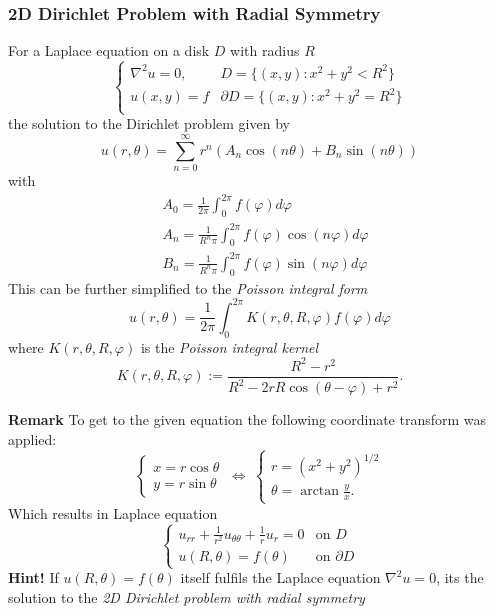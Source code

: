 \subsubsection{2D Dirichlet Problem with Radial Symmetry}\label{sssec:laplace_dir_radial}
For a Laplace equation on a disk $D$ with radius $R$
\begin{equation*}
    \begin{cases}
        \nabla^2 u=0, & D=\{(x,y): x^2+y^2 < R^2\}          \\
        u(x,y)=f      & \partial D=\{(x,y): x^2+y^2 = R^2\} \\
    \end{cases}
\end{equation*}
the solution to the Dirichlet problem given by
\begin{equation*}
    u(r,\theta)=\sum_{n=0}^\infty r^n(A_n\cos(n\theta)+B_n\sin(n\theta))
\end{equation*}
with
\begin{align*}
     & A_{0} =\frac{1}{2\pi}\int_0^{2\pi}f(\varphi)d\varphi                 \\
     & A_{n} =\frac{1}{R^n\pi}\int_0^{2\pi}f(\varphi)\cos(n\varphi)d\varphi \\
     & B_{n} =\frac{1}{R^n\pi}\int_0^{2\pi}f(\varphi)\sin(n\varphi)d\varphi
\end{align*}
This can be further simplified to the \textit{Poisson integral form}
\begin{equation*}
    u(r,\theta)=\frac{1}{2\pi}\int_0^{2\pi}K(r,\theta,R,\varphi)f(\varphi)d\varphi
\end{equation*}
where $K(r,\theta,R,\varphi)$ is the \textit{Poisson integral kernel}
\begin{equation*}
    K(r,\theta,R,\varphi):=\frac{R^2-r^2}{R^2-2rR\cos(\theta-\varphi)+r^2}.
\end{equation*}

\textbf{Remark}
To get to the given equation the following coordinate transform was applied:
\begin{equation*}
    \begin{cases}
        x=r\cos\theta \\
        y=r\sin\theta
    \end{cases}
    \:\Leftrightarrow\:
    \begin{cases}
        r={(x^2+y^2)}^{1/2} \\
        \theta=\arctan\frac yx.
    \end{cases}
\end{equation*}
Which results in Laplace equation
\begin{equation*}
    \begin{cases}
        u_{rr} + \frac{1}{r^2}u_{\theta\theta}+\frac{1}{r}u_r = 0 & \text{on } D          \\
        u(R,\theta)=f(\theta)                                     & \text{on } \partial D
    \end{cases}
\end{equation*}
\textbf{Hint!} If $u(R,\theta)=f(\theta)$ itself fulfils the Laplace equation $\nabla^2u=0$, its the solution
to the \textit{2D Dirichlet problem with radial symmetry}

